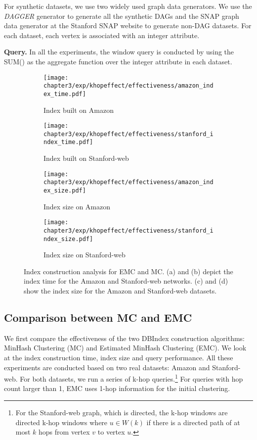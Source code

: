 For synthetic datasets, we use two widely used graph data generators. 
We use the \emph{DAGGER} generator \cite{yildirim2013dagger} to generate 
all the synthetic DAGs and the SNAP graph data generator at the
Stanford SNAP website to generate non-DAG datasets. For each dataset, each vertex is associated with an integer attribute.

\textbf{Query.} In all the experiments, the window query is conducted 
by using the SUM() as the aggregate function over the integer attribute in each dataset. 

\begin{figure*}[t]
\centering
\begin{subfigure}{0.45\textwidth}
  \texttt{[image: chapter3/exp/khopeffect/effectiveness/amazon\_index\_time.pdf]}
  \caption{Index built on Amazon}
\end{subfigure}
\begin{subfigure}{0.45\textwidth}
  \texttt{[image: chapter3/exp/khopeffect/effectiveness/stanford\_index\_time.pdf]}
  \caption{Index built on Stanford-web}
\end{subfigure}

\begin{subfigure}{0.45\textwidth}
  \texttt{[image: chapter3/exp/khopeffect/effectiveness/amazon\_index\_size.pdf]}
  \caption{Index size on Amazon}
\end{subfigure}
\begin{subfigure}{0.45\textwidth}
  \texttt{[image: chapter3/exp/khopeffect/effectiveness/stanford\_index\_size.pdf]}
  \caption{Index size on Stanford-web}
\end{subfigure}
\caption{Index construction analysis for EMC and MC. (a) and (b) 
depict the index time for the Amazon and Stanford-web networks.
(c) and (d) show the index size for the Amazon and Stanford-web datasets.}
\label{fig:index_analysis_emc_mc}
\end{figure*}


\subsection{Comparison between MC and EMC}\label{sec:mc_vs_emc}
We first compare the effectiveness of the two DBIndex 
construction algorithms: MinHash Clustering (MC) and Estimated 
MinHash Clustering (EMC). We look at 
the index construction time, index size and query performance. 
All these experiments are conducted based on two real datasets: 
Amazon and Stanford-web. For both datasets, we run a series of k-hop queries.\footnote{For the Stanford-web graph, which is directed,
the k-hop windows are directed k-hop windows where $u \in W(k)$ if there is a directed path
of at most $k$ hops from vertex $v$ to vertex $u$.
} For queries with hop count larger than 1, 
EMC uses 1-hop information for the initial clustering. 

